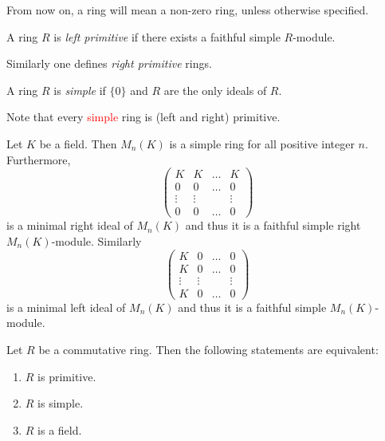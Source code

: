\begin{convention}
From now on, a ring will mean a non-zero ring, unless otherwise specified. 
\end{convention}

\begin{definition}
A ring $R$ is \emph{left primitive} if there exists a faithful simple $R$-module. 
\end{definition}

Similarly one defines \emph{right primitive} rings. 

\begin{definition}
A ring $R$ is \emph{simple} if $\{0\}$ and $R$ are the only ideals of $R$.
\end{definition}

Note that every \textcolor{red}{simple} ring is (left and right) primitive.

\begin{example}
Let $K$ be a field. Then $M_n(K)$ is a simple ring for all positive integer $n$. Furthermore,
\[
\left(\begin{array}{cccc} K&K&\ldots&K\\
0&0&\ldots&0\\
\vdots &\vdots &&\vdots\\
0&0&\ldots&0\end{array}\right)
\]
is a minimal right ideal of $M_n(K)$ and thus it is a faithful simple
right $M_n(K)$-module. Similarly
\[
\left(\begin{array}{cccc} K&0&\ldots&0\\
	K&0&\ldots&0\\
	\vdots &\vdots &&\vdots\\
	K&0&\ldots&0\end{array}\right)
\]
is a minimal left ideal of $M_n(K)$ and thus it is a faithful simple
$M_n(K)$-module. 
\end{example}

\begin{proposition}
\label{Prop1.2.1}
Let $R$ be a commutative ring. Then the following statements are equivalent:
\begin{enumerate}
\item $R$ is primitive.
\item $R$ is simple.
\item $R$ is a field.
\end{enumerate}
\end{proposition}

